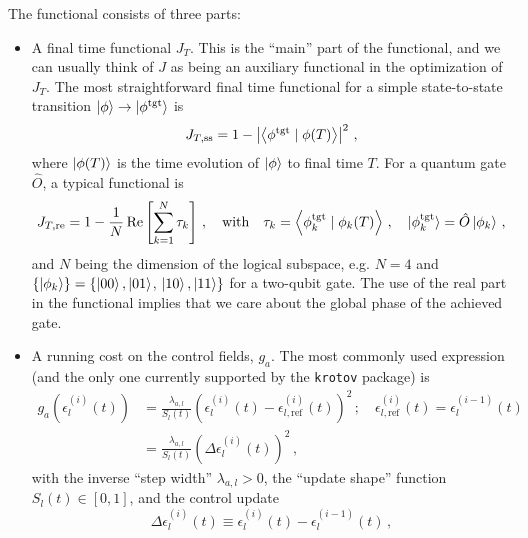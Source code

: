 \documentclass[submission, Phys]{SciPost}
\newcommand{\tgt}[0]{\text{tgt}}
\renewcommand{\Braket}[2]{\left\langle{}#1\vphantom{#2}\mid{}#2\vphantom{#1}\right\rangle}
\newcommand{\Op}[1]{\hat{#1}}
\newcommand{\Abs}[1]{\left\vert#1\right\vert}
\renewcommand{\Re}[0]{\operatorname{Re}}
\begin{document}
The functional consists of three parts:
\begin{itemize}
\item
  A final time functional \(J_T\).
  This is the ``main'' part of the functional, and we can usually think of \(J\)
  as being an auxiliary functional in the optimization of \(J_T\).
  The most straightforward final time functional for a simple state-to-state
  transition $\ket{\phi} \rightarrow \ket{\phi^{\tgt}}$ is~\cite{PalaoPRA2003}
  \begin{equation}%
    \label{eq:JTss}
    J_{T,\text{ss}} = 1 - \Abs{\Braket{\phi^\tgt}{\phi(T)}}^2\,,
  \end{equation}
  where $\ket{\phi(T)}$ is the time evolution of $\ket{\phi}$ to final time $T$.
  For a quantum gate $\Op{O}$, a typical functional is~\cite{PalaoPRA2003}
  \begin{equation}%
    \label{eq:JTre}
    J_{T,\text{re}} = 1- \frac{1}{N} \Re\left[ \sum_{k=1}^{N} \tau_k \right]\,,
    \quad\text{with}\quad
    \tau_k = \Braket{\phi_k^\tgt}{\phi_k(T)}\,,\quad
    \ket{\phi_k^{\tgt}} = \Op{O} \ket{\phi_k}\,,
  \end{equation}
  and $N$ being the dimension of the logical subspace, e.g. $N=4$
  and $\{\ket{\phi_k}\} = \{\ket{00}, \ket{01}$, $\ket{10}, \ket{11} \}$ for
  a two-qubit gate.
  The use of the real part in the functional implies that we
  care about the global phase of the achieved gate.
\item
  A running cost on the control fields, \(g_a\).
  The most commonly used expression (and the only one currently supported by the
  \texttt{krotov} package) is~\cite{PalaoPRA2003}
  \begin{equation}
  \begin{split}
    \label{eq:g_a}
    g_a(\epsilon_l^{(i)}(t))
    &= \frac{\lambda_{a,l}}{S_l(t)} \left(
        \epsilon_l^{(i)}(t) - \epsilon_{l, \text{ref}}^{(i)}(t)
      \right)^2\,;
      \quad
    \epsilon^{(i)}_{l, \text{ref}}(t) = \epsilon_l^{(i-1)}(t)\\
   &= \frac{\lambda_{a,l}}{S_l(t)} \left( \Delta\epsilon_l^{(i)}(t) \right)^2
   \,,
  \end{split}
  \end{equation}
  with the inverse ``step width'' $\lambda_{a,l} > 0$, the ``update shape''
  function $S_{l}(t) \in [0, 1]$, and the control update
  \begin{equation}%
    \label{eq:update}
    \Delta\epsilon_l^{(i)}(t)
    \equiv \epsilon_l^{(i)}(t) - \epsilon_l^{(i-1)}(t)\,,
  \end{equation}

\end{itemize}
\end{document}

